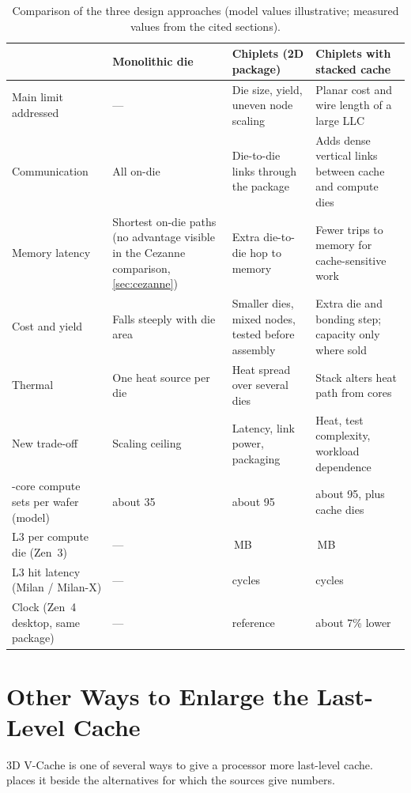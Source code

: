 \begin{table}[htbp]
  \centering
  \caption[Comparison of the three design approaches]{Comparison of the three design approaches (model values illustrative; measured values from the cited sections).}
  \label{tab:three-way}
  \small
  \begin{tabularx}{\textwidth}{@{}>{\raggedright\arraybackslash}p{2.6cm}>{\raggedright\arraybackslash}X>{\raggedright\arraybackslash}X>{\raggedright\arraybackslash}X@{}}
    \toprule
    & \textbf{Monolithic die} & \textbf{Chiplets (2D package)} & \textbf{Chiplets with stacked cache} \\
    \midrule
    Main limit addressed & --- & Die size, yield, uneven node scaling & Planar cost and wire length of a large LLC \\
    Communication & All on-die & Die-to-die links through the package & Adds dense vertical links between cache and compute dies \\
    Memory latency & Shortest on-die paths (no advantage visible in the Cezanne comparison, \cref{sec:cezanne}) & Extra die-to-die hop to memory & Fewer trips to memory for cache-sensitive work \\
    Cost and yield & Falls steeply with die area & Smaller dies, mixed nodes, tested before assembly & Extra die and bonding step; capacity only where sold \\
    Thermal & One heat source per die & Heat spread over several dies & Stack alters heat path from cores \\
    New trade-off & Scaling ceiling & Latency, link power, packaging & Heat, test complexity, workload dependence \\
    \midrule
    64-core compute sets per wafer (model) & about 35 & about 95 & about 95, plus cache dies \\
    L3 per compute die (Zen~3) & --- & 32\,MB & 96\,MB \\
    L3 hit latency (Milan / Milan-X) & --- & 47.5 cycles & 51.1 cycles \\
    Clock (Zen~4 desktop, same package) & --- & reference & about 7\% lower \\
    \bottomrule
  \end{tabularx}
\end{table}

\section{Other Ways to Enlarge the Last-Level Cache}
\label{sec:llc-alternatives}
3D V-Cache is one of several ways to give a processor more last-level cache.  places it beside the alternatives for which the sources give numbers.

